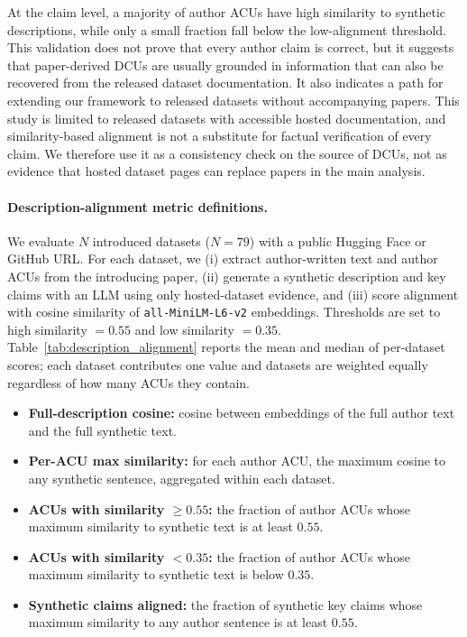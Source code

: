 \documentclass[11pt]{article}
\begin{document}
At the claim level, a majority of author ACUs have high similarity to synthetic descriptions, while only a small fraction fall below the low-alignment threshold.
This validation does not prove that every author claim is correct, but it suggests that paper-derived DCUs are usually grounded in information that can also be recovered from the released dataset documentation.
It also indicates a path for extending our framework to released datasets without accompanying papers.
This study is limited to released datasets with accessible hosted documentation, and similarity-based alignment is not a substitute for factual verification of every claim.
We therefore use it as a consistency check on the source of DCUs, not as evidence that hosted dataset pages can replace papers in the main analysis.
\paragraph{Description-alignment metric definitions.}
We evaluate $N$ introduced datasets ($N{=}79$) with a public Hugging Face or GitHub URL.
For each dataset, we (i) extract author-written text and author ACUs from the introducing paper,
(ii) generate a synthetic description and key claims with an LLM using only hosted-dataset evidence, and
(iii) score alignment with cosine similarity of \texttt{all-MiniLM-L6-v2} embeddings.
Thresholds are set to high similarity $=0.55$ and low similarity $=0.35$.
Table~\ref{tab:description_alignment} reports the mean and median of per-dataset scores; each dataset contributes one value and datasets are weighted equally regardless of how many ACUs they contain.

\begin{itemize}
  \item \textbf{Full-description cosine:} cosine between embeddings of the full author text and the full synthetic text.
  \item \textbf{Per-ACU max similarity:} for each author ACU, the maximum cosine to any synthetic sentence, aggregated within each dataset.
  \item \textbf{ACUs with similarity $\geq 0.55$:} the fraction of author ACUs whose maximum similarity to synthetic text is at least $0.55$.
  \item \textbf{ACUs with similarity $< 0.35$:} the fraction of author ACUs whose maximum similarity to synthetic text is below $0.35$.
  \item \textbf{Synthetic claims aligned:} the fraction of synthetic key claims whose maximum similarity to any author sentence is at least $0.55$.
\end{itemize}
\end{document}
